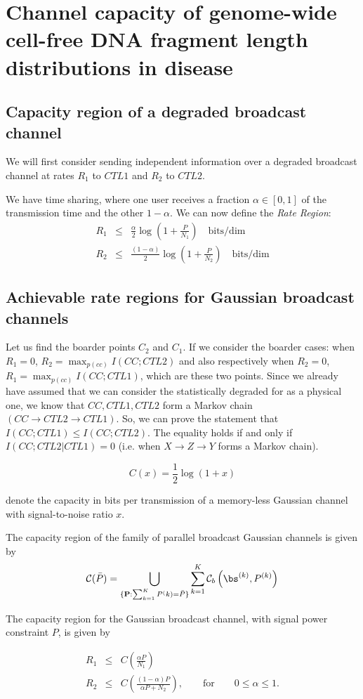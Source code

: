 \documentclass[]{revtex4}
\begin{document}
\section{Channel capacity of genome-wide cell-free DNA fragment length distributions in disease}
\subsection{Capacity region of a degraded broadcast channel}
We will first consider sending independent information over a degraded broadcast channel at rates $R_1$ to $CTL1$ and $R_2$ to $CTL2$. 
    \vspace {2ex}

We have time sharing, where one user receives a fraction $\alpha\in[0, 1]$ of the transmission time and the other $1-\alpha$. We can now define the {\it Rate Region}:
\begin{eqnarray}
R_1&\le&\frac{\alpha}{2}\log\left(1+\frac{P}{N_1}\right)\quad \mbox{bits/dim}\\
R_2&\le&\frac{(1-\alpha)}{2}\log\left(1+\frac{P}{N_2}\right)\quad \mbox{bits/dim}
\end{eqnarray}

\subsection{Achievable rate regions for Gaussian broadcast channels}



Let us find the boarder points $C_2$ and $C_1$. If we consider the boarder cases: when $R_1=0$, $R_2=\max_{p(cc)}I(CC; CTL2)$ and also respectively when $R_2=0$, $R_1=\max_{p(cc)}I(CC; CTL1)$, which are these two points. Since we already have assumed that we can consider the statistically degraded for as a physical one, we know that $CC, CTL1, CTL2$ form a Markov chain $(CC\rightarrow CTL2\rightarrow CTL1)$. So, we can prove the statement that $I(CC; CTL1)\le I(CC; CTL2)$. The equality holds if and only if $I(CC;CTL2|CTL1)=0$ (i.e. when $X\rightarrow Z\rightarrow Y$ forms a Markov chain).

\begin{equation}
C(x)=\frac{1}{2}\log(1+x)
\end{equation}

denote the capacity in bits per transmission of a memory-less Gaussian channel with signal-to-noise ratio $x$.
    \vspace {2ex}

\begin{thm} 
The capacity region of the family of parallel broadcast Gaussian channels is given by
\begin{eqnarray}
\mathcal{C}(\bar{P})=\bigcup_{\{{\bf P}:\sum_{k=1}^K P^(k)=\bar{P}\}}\sum_{k=1}^K\mathcal{C}_b\left({\bf \bs}^{(k)}, P^{(k)}\right)
\end{eqnarray}
\end{thm}

 \begin{thm} The capacity region for the Gaussian broadcast channel, with signal power constraint $P$, is given by 

\begin{eqnarray}
R_1&\le&C\left(\frac{\alpha P}{N_1}\right)\\
R_2&\le&C\left(\frac{(1-\alpha )P}{\alpha P+N_2}\right),\qquad\mbox{for}\qquad 0\le\alpha\le 1.
\end{eqnarray}
\end{thm}
\end{document}
